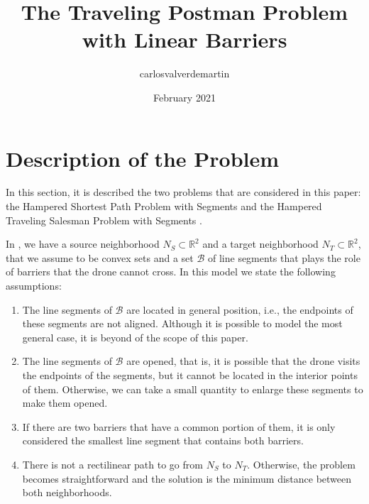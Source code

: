\documentclass{article}
\title{The Traveling Postman Problem with Linear Barriers}
\author{carlosvalverdemartin }
\date{February 2021}
\newcommand{\SPP}{{\sf{H-SPP-S} \xspace}}
\newcommand{\TSP}{{\sf{H-TSP-S} \xspace}}
\begin{document}
\section{Description of the Problem}
In this section, it is described the two problems that are considered in this paper: the Hampered Shortest Path Problem with Segments \SPP and the Hampered Traveling Salesman Problem with Segments \TSP. 

In \SPP, we have a source neighborhood $N_S\subset\mathbb R^2$ and a target neighborhood $N_T\subset\mathbb R^2$, that we assume to be convex sets and a set $\mathcal B$ of line segments that plays the role of barriers that the drone cannot cross. In this model we state the following assumptions:

\begin{enumerate}[label=\textbf{A\arabic*},ref=\textbf{A\arabic*}]
\item \label{A1}The line segments of $\mathcal B$ are located in general position, i.e., the endpoints of these segments are not aligned. Although it is possible to model the most general case, it is beyond of the scope of this paper.
\item The line segments of $\mathcal B$ are opened, that is, it is possible that the drone visits the endpoints of the segments, but it cannot be located in the interior points of them. Otherwise, we can take a small quantity to enlarge these segments to make them opened.
\item If there are two barriers that have a common portion of them, it is only considered the smallest line segment that contains both barriers.
\item \label{A4}There is not a rectilinear path to go from $N_S$ to $N_T$. Otherwise, the problem becomes straightforward and the solution is the minimum distance between both neighborhoods.
\end{enumerate}
\end{document}
